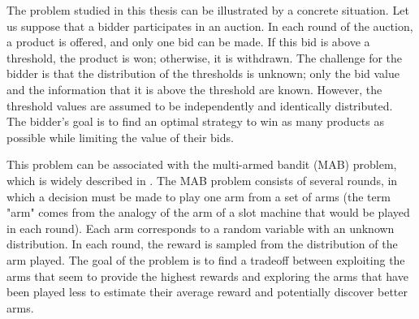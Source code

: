 \documentclass{statsmsc}
\begin{document}








The problem studied in this thesis can be illustrated by a concrete situation. Let us suppose that a bidder participates in an auction. In each round of the auction, a product is offered, and only one bid can be made. If this bid is above a threshold, the product is won; otherwise, it is withdrawn. 
The challenge for the bidder is that the distribution of the thresholds is unknown; only the bid value and the information that it is above the threshold are known. However, the threshold values are assumed to be independently and identically distributed. The bidder's goal is to find an optimal 
strategy to win as many products as possible while limiting the value of their bids.

This problem can be associated with the multi-armed bandit (MAB) problem, which is widely described in \cite{slivkins2024introductionmultiarmedbandits}.
The MAB problem consists of several rounds, in which a decision must be made to play one arm from a set of arms (the term "arm" comes from the analogy of the arm of a slot machine that would be played in each round). Each arm corresponds to a random variable with an unknown distribution. 
In each round, the reward is sampled from the distribution of the arm played. The goal of the problem is to find a tradeoff between exploiting the arms that seem to provide the highest rewards and exploring the arms that have been played less to estimate their average reward and potentially discover better arms.
\end{document}
